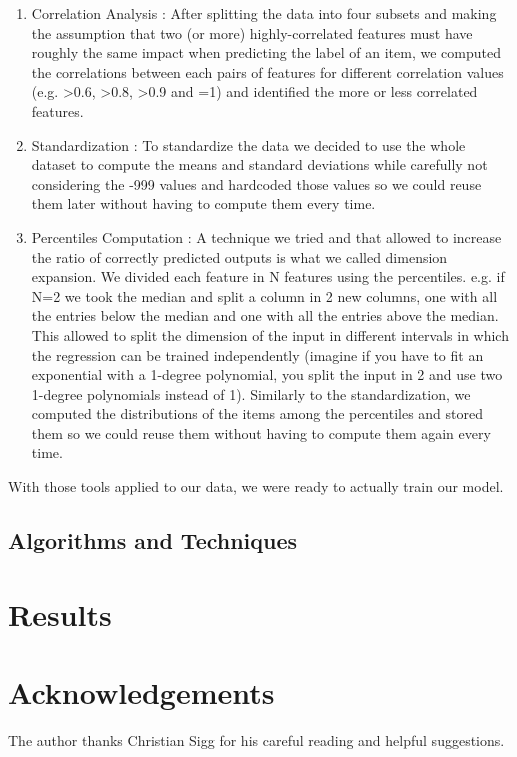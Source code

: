 \documentclass[10pt,conference,compsocconf]{IEEEtran}
\begin{document}
\begin{enumerate}
\item Correlation Analysis :
After splitting the data into four subsets and making the assumption that two (or more) highly-correlated features must have roughly the same impact when predicting the label of an item, we computed the correlations between each pairs of features for different correlation values (e.g. >0.6, >0.8, >0.9 and =1) and identified the more or less correlated features.


\item Standardization :
To standardize the data we decided to use the whole dataset to compute the means and standard deviations while carefully not considering the -999 values and hardcoded those values so we could reuse them later without having to compute them every time. 

\item Percentiles Computation :
A technique we tried and that allowed to increase the ratio of correctly predicted outputs is what we called dimension expansion. We divided each feature in N features using the percentiles. e.g. if N=2 we took the median and split a column in 2 new columns, one with all the entries below the median and one with all the entries above the median. This allowed to split the dimension of the input in different intervals in which the regression can be trained independently (imagine if you have to fit an exponential with a 1-degree polynomial, you split the input in 2 and use two 1-degree polynomials instead of 1). Similarly to the standardization, we computed the distributions of the items among the percentiles and stored them so we could reuse them without having to compute them again every time.

\end{enumerate}

With those tools applied to our data, we were ready to actually  train our model.
\subsection{Algorithms and Techniques}


\section{Results}


\section*{Acknowledgements}
The author thanks Christian Sigg for his careful reading and helpful
suggestions.



\end{document}
